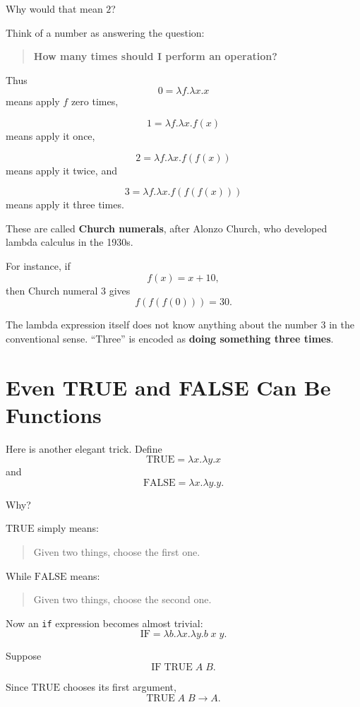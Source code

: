 \documentclass[11pt]{article}
\begin{document}
Why would that mean \(2\)?

Think of a number as answering the question:

\begin{quote}
\textbf{How many times should I perform an operation?}
\end{quote}

Thus
\[
0=\lambda f.\lambda x.x
\]
means apply \(f\) zero times,

\[
1=\lambda f.\lambda x.f(x)
\]
means apply it once,

\[
2=\lambda f.\lambda x.f(f(x))
\]
means apply it twice, and

\[
3=\lambda f.\lambda x.f(f(f(x)))
\]
means apply it three times.

These are called \textbf{Church numerals}, after Alonzo Church, who
developed lambda calculus in the 1930s.

For instance, if
\[
f(x)=x+10,
\]
then Church numeral \(3\) gives
\[
f(f(f(0)))=30.
\]

The lambda expression itself does not know anything about the number
\(3\) in the conventional sense. ``Three'' is encoded as
\textbf{doing something three times}.

\section{Even TRUE and FALSE Can Be Functions}

Here is another elegant trick. Define
\[
\mathrm{TRUE}=\lambda x.\lambda y.x
\]
and
\[
\mathrm{FALSE}=\lambda x.\lambda y.y.
\]

Why?

\(\mathrm{TRUE}\) simply means:

\begin{quote}
Given two things, choose the first one.
\end{quote}

While \(\mathrm{FALSE}\) means:

\begin{quote}
Given two things, choose the second one.
\end{quote}

Now an \texttt{if} expression becomes almost trivial:
\[
\mathrm{IF}=\lambda b.\lambda x.\lambda y.b\;x\;y.
\]

Suppose
\[
\mathrm{IF}\;\mathrm{TRUE}\;A\;B.
\]

Since \(\mathrm{TRUE}\) chooses its first argument,
\[
\mathrm{TRUE}\;A\;B \longrightarrow A.
\]
\end{document}
